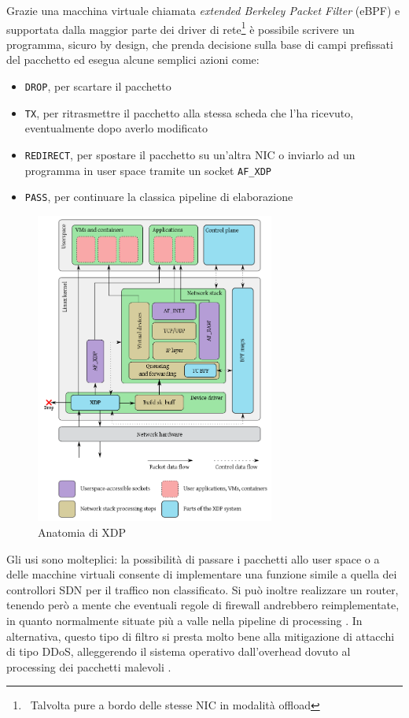 Grazie una macchina virtuale chiamata \textit{extended Berkeley Packet Filter} (eBPF) e supportata dalla maggior parte dei driver di rete\footnote{\ Talvolta pure a bordo delle stesse NIC in modalità offload} è possibile scrivere un programma, sicuro by design, che prenda decisione sulla base di campi prefissati del pacchetto ed esegua alcune semplici azioni come:

\begin{itemize}
    \item \verb|DROP|, per scartare il pacchetto
    \item \verb|TX|, per ritrasmettre il pacchetto alla stessa scheda che l'ha ricevuto, eventualmente dopo averlo modificato
    \item \verb|REDIRECT|, per spostare il pacchetto su un'altra NIC o inviarlo ad un programma in user space tramite un socket \verb|AF_XDP|
    \item \verb|PASS|, per continuare la classica pipeline di elaborazione
\end{itemize}

\begin{figure}[htb]
    \includegraphics[width=0.7\textwidth]{graphics/xdp-datapath.png}
    \caption{Anatomia di XDP}
    \label{fig:xdp-datapath}
\end{figure}

Gli usi sono molteplici: la possibilità di passare i pacchetti allo user space o a delle macchine virtuali consente di implementare una funzione simile a quella dei controllori SDN per il traffico non classificato. Si può inoltre realizzare un router, tenendo però a mente che eventuali regole di firewall andrebbero reimplementate, in quanto normalmente situate più a valle nella pipeline di processing \cite{xdp-router-apnic}. In alternativa, questo tipo di filtro si presta molto bene alla mitigazione di attacchi di tipo DDoS, alleggerendo il sistema operativo dall'overhead dovuto al processing dei pacchetti malevoli \cite{cloudflare-ddos-xdp}.

